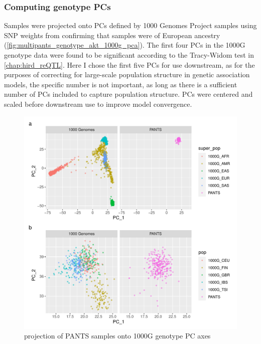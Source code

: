 \begin{outline}
\subsubsection{Computing genotype PCs}

Samples were projected onto \glspl{PC} defined by 1000 Genomes Project samples using \gls{SNP} weights from  
confirming that samples were of European ancestry (\autoref{fig:multipants_genotype_akt_1000g_pca}).
The first four \glspl{PC} in the 1000G genotype data were found to be significant according to the Tracy-Widom test in \autoref{chap:hird_reQTL}.
Here I chose the first five \glspl{PC} for use downstream, as for the purposes of correcting for large-scale population structure in genetic association models,
the specific number is not important, as long as there is a sufficient number of \glspl{PC} included to capture population structure\autocite{price2006PrincipalComponentsAnalysis}.
\glspl{PC} were centered and scaled before downstream use to improve model convergence.


\begin{figure}
    \centering
    \includegraphics[width=1.0\textwidth,page=1]{mainmatter/figures/chapter_04/pants_samples.sampleids_cleaned_to_lowercase.filtered.GRCh38.sorted.multiPANTS.projection_1000G_pca.pdf}
    \caption{projection of PANTS samples onto 1000G genotype PC axes}
    \label{fig:multipants_genotype_akt_1000g_pca}
\end{figure}


\end{outline}
